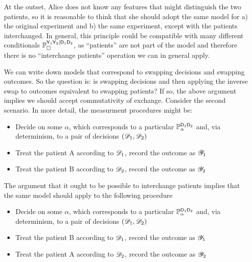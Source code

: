 At the outset, Alice does not know any features that might distinguish the two patients, so it is reasonable to think that she should adopt the same model for a) the original experiment and b) the same experiment, except with the patients interchanged. In general, this principle could be compatible with many different conditionals $\mathbb{P}_\square^{\mathsf{Y}_1\mathsf{Y}_2|\mathsf{D}_1\mathsf{D}_2}$, as ``patients'' are not part of the model and therefore there is no ``interchange patients'' operation we can in general apply.

We can write down models that correspond to swapping decisions and swapping outcomes. So the question is: is swapping decisions and then applying the inverse swap to outcomes equivalent to swapping patients? If so, the above argument implies we should accept commutativity of exchange. Consider the second scenario. In more detail, the measurment procedures might be:


\begin{itemize}
    \item Decide on some $\alpha$, which corresponds to a particular $\mathbb{P}_\alpha^{\mathsf{D}_1\mathsf{D}_2}$ and, via determinism, to a pair of decisions $(\mathscr{D}_1,\mathscr{D}_2)$
    \item Treat the patient A according to $\mathscr{D}_1$, record the outcome as $\mathscr{Y}_1$
    \item Treat the patient B according to $\mathscr{D}_2$, record the outcome as $\mathscr{Y}_2$
\end{itemize}

The argument that it ought to be possible to interchange patients implies that the same model should apply to the following procedure

\begin{itemize}
    \item Decide on some $\alpha$, which corresponds to a particular $\mathbb{P}_\alpha^{\mathsf{D}_1\mathsf{D}_2}$ and, via determinism, to a pair of decisions $(\mathscr{D}_1,\mathscr{D}_2)$
    \item Treat the patient B according to $\mathscr{D}_1$, record the outcome as $\mathscr{Y}_1$
    \item Treat the patient A according to $\mathscr{D}_2$, record the outcome as $\mathscr{Y}_2$
\end{itemize}


